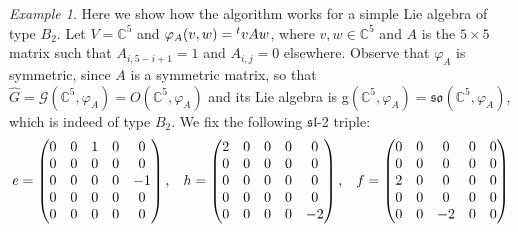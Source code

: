 \documentclass[a4paper,10pt]{amsart}
\numberwithin{equation}{section}
\theoremstyle{remark}
\theoremstyle{remark}
\newtheorem{example}[theorem]{Example}
\begin{document}
\begin{example}
        Here we show how the algorithm works for a simple Lie algebra of type $B_2$. Let $V=\mathbb{C}^5$ and $\varphi_A(v,w)=\prescript{t}{}vAw$, where $v,w\in\mathbb{C}^5$ and $A$ is the $5\times 5$ matrix such that $A_{i,5-i+1}=1$ and $A_{i,j}=0$ elsewhere. Observe that $\varphi_A$ is symmetric, since $A$ is a symmetric matrix, so that $\hat{G}=\mathcal{G}(\mathbb{C}^5,\varphi_A)=O(\mathbb{C}^5,\varphi_A)$ and its Lie algebra is g$(\mathbb{C}^5,\varphi_A)=\mathfrak{so}(\mathbb{C}^5,\varphi_A)$, which is indeed of type $B_2$. We fix the following $\mathfrak{sl}$-2 triple:$$e=\begin{pmatrix}
        0 & 0 & 1 & 0 & 0\\
        0 & 0 & 0 & 0 & 0\\
        0 & 0 & 0 & 0 & -1\\
        0 & 0 & 0 & 0 & 0\\
        0 & 0 & 0 & 0 & 0\\
    \end{pmatrix},\hspace{0.3cm} h=\begin{pmatrix}
        2 & 0 & 0 & 0 & 0\\
        0 & 0 & 0 & 0 & 0\\
        0 & 0 & 0 & 0 & 0\\
        0 & 0 & 0 & 0 & 0\\
        0 & 0 & 0 & 0 & -2\\
    \end{pmatrix},\hspace{0.3cm} f=\begin{pmatrix}
        0 & 0 & 0 & 0 & 0\\
        0 & 0 & 0 & 0 & 0\\
        2 & 0 & 0 & 0 & 0\\
        0 & 0 & 0 & 0 & 0\\
        0 & 0 & -2 & 0 & 0\\

\end{pmatrix}$$
\end{example}
\end{document}
